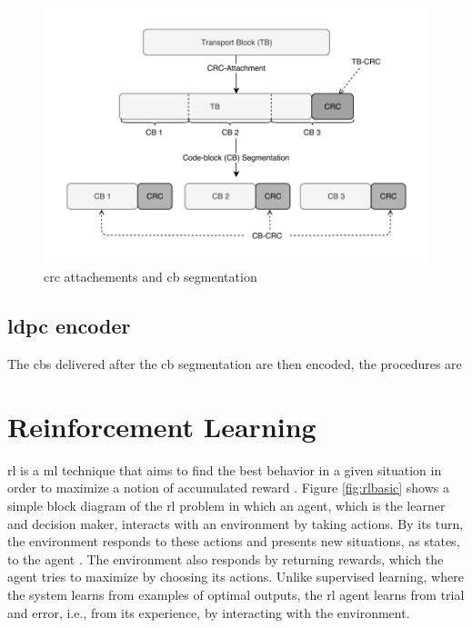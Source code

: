 \begin{figure}[htb]
    \includegraphics[width=\columnwidth]{figures/chp_theory/crc.pdf}
    \caption{\gls{crc} attachements and \gls{cb} segmentation}
    \label{fig:cbcrc}
\end{figure}


\subsection{\gls{ldpc} encoder}

The \glspl{cb} delivered after the \gls{cb} segmentation are then encoded, the procedures are





\section{Reinforcement Learning }
\label{sec:rl-theory}
\Gls{rl} is a \gls{ml} technique that aims to find the best behavior in a given situation in order to maximize a notion of accumulated reward \cite{Bishop07}.
%
Figure \ref{fig:rlbasic} shows a simple block diagram of the \gls{rl} problem in which an agent, which is the learner and decision maker, interacts with an environment by taking actions.
%
By its turn, the environment responds to these actions and presents new situations, as states, to the agent \cite{sutton2018rl}.
%
The environment also responds by returning rewards, which the agent tries to maximize by choosing its actions.
%
Unlike supervised learning, where the system learns from examples of optimal outputs, the \gls{rl} agent learns from trial and error, i.e., from its experience, by interacting with the environment.

